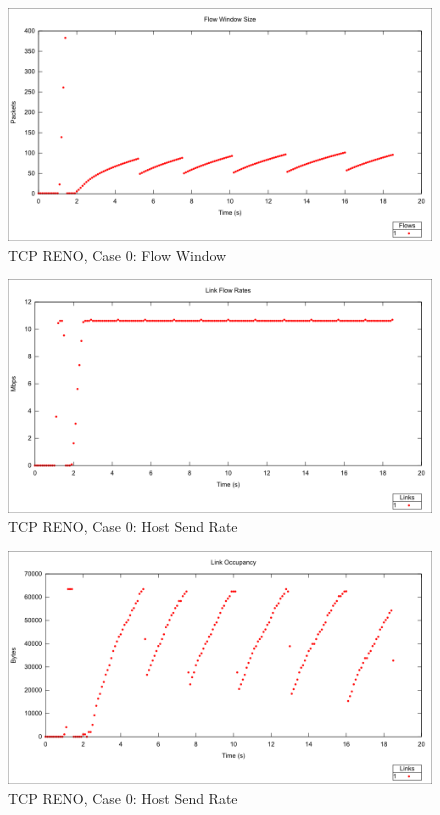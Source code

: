 \begin{figure}[htbp]
    \centering
    \includegraphics[width=\textwidth]{reno0/Flow_Window.png}
    \caption{TCP RENO, Case 0: Flow Window}
\end{figure}


\begin{figure}[htbp]
    \centering
    \includegraphics[width=\textwidth]{reno0/Link_Flow_Rate.png}
    \caption{TCP RENO, Case 0: Host Send Rate}
\end{figure}

\begin{figure}[htbp]
    \centering
    \includegraphics[width=\textwidth]{reno0/Link_Occupancy.png}
    \caption{TCP RENO, Case 0: Host Send Rate}
\end{figure}


